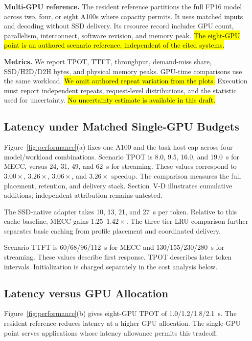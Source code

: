 \documentclass[conference,9pt,letterpaper]{IEEEtran}
\newcommand{\draftnote}[1]{{\sethlcolor{DraftYellow}\hl{#1}}}
\newcommand{\draftvalue}[1]{{\setlength{\fboxsep}{0.4pt}\colorbox{DraftYellow}{#1}}}
\newcommand{\mecc}{\textsc{MECC}}
\begin{document}
\textbf{Multi-GPU reference.} The resident reference partitions the full FP16 model across two, four, or eight A100s where capacity permits. It uses matched inputs and decoding without SSD delivery. Its resource record includes GPU count, parallelism, interconnect, software revision, and memory peak. \draftnote{The eight-GPU point is an authored scenario reference, independent of the cited systems.}

\textbf{Metrics.} We report TPOT, TTFT, throughput, demand-miss share, SSD/H2D/D2H bytes, and physical memory peaks. GPU-time comparisons use the same workload. \draftnote{We omit authored repeat variation from the plots.} Execution must report independent repeats, request-level distributions, and the statistic used for uncertainty. \draftnote{No uncertainty estimate is available in this draft.}

\subsection{Latency under Matched Single-GPU Budgets}
Figure~\ref{fig:performance}(a) fixes one A100 and the task host cap across four model/workload combinations. Scenario TPOT is \draftvalue{8.0}, \draftvalue{9.5}, \draftvalue{16.0}, and \draftvalue{19.0}~s for \mecc{}, versus \draftvalue{24}, \draftvalue{31}, \draftvalue{49}, and \draftvalue{62}~s for streaming. These values correspond to \draftvalue{$3.00\times$}, \draftvalue{$3.26\times$}, \draftvalue{$3.06\times$}, and \draftvalue{$3.26\times$} speedup. The comparison measures the full placement, retention, and delivery stack. Section~V-D illustrates cumulative additions; independent attribution remains untested.

The SSD-native adapter takes \draftvalue{10}, \draftvalue{13}, \draftvalue{21}, and \draftvalue{27}~s per token. Relative to this cache baseline, \mecc{} gains \draftvalue{$1.25$}--\draftvalue{$1.42\times$}. The three-tier-LRU comparison further separates basic caching from profile placement and coordinated delivery.

Scenario TTFT is \draftvalue{60/68/96/112}~s for \mecc{} and \draftvalue{130/155/230/280}~s for streaming. These values describe first response. TPOT describes later token intervals. Initialization is charged separately in the cost analysis below.

\subsection{Latency versus GPU Allocation}
Figure~\ref{fig:performance}(b) gives eight-GPU TPOT of \draftvalue{1.0/1.2/1.8/2.1}~s. The resident reference reduces latency at a higher GPU allocation. The single-GPU point serves applications whose latency allowance permits this tradeoff.
\end{document}
